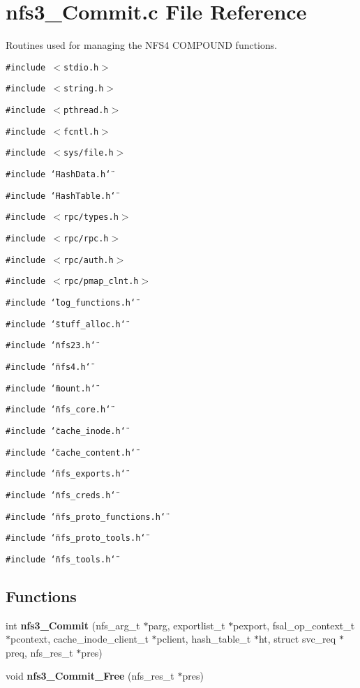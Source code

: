 \section{nfs3\_\-Commit.c File Reference}
\label{nfs3__Commit_8c}
Routines used for managing the NFS4 COMPOUND functions. 

{\tt \#include $<$stdio.h$>$}\par
{\tt \#include $<$string.h$>$}\par
{\tt \#include $<$pthread.h$>$}\par
{\tt \#include $<$fcntl.h$>$}\par
{\tt \#include $<$sys/file.h$>$}\par
{\tt \#include \char`\"{}Hash\-Data.h\char`\"{}}\par
{\tt \#include \char`\"{}Hash\-Table.h\char`\"{}}\par
{\tt \#include $<$rpc/types.h$>$}\par
{\tt \#include $<$rpc/rpc.h$>$}\par
{\tt \#include $<$rpc/auth.h$>$}\par
{\tt \#include $<$rpc/pmap\_\-clnt.h$>$}\par
{\tt \#include \char`\"{}log\_\-functions.h\char`\"{}}\par
{\tt \#include \char`\"{}stuff\_\-alloc.h\char`\"{}}\par
{\tt \#include \char`\"{}nfs23.h\char`\"{}}\par
{\tt \#include \char`\"{}nfs4.h\char`\"{}}\par
{\tt \#include \char`\"{}mount.h\char`\"{}}\par
{\tt \#include \char`\"{}nfs\_\-core.h\char`\"{}}\par
{\tt \#include \char`\"{}cache\_\-inode.h\char`\"{}}\par
{\tt \#include \char`\"{}cache\_\-content.h\char`\"{}}\par
{\tt \#include \char`\"{}nfs\_\-exports.h\char`\"{}}\par
{\tt \#include \char`\"{}nfs\_\-creds.h\char`\"{}}\par
{\tt \#include \char`\"{}nfs\_\-proto\_\-functions.h\char`\"{}}\par
{\tt \#include \char`\"{}nfs\_\-proto\_\-tools.h\char`\"{}}\par
{\tt \#include \char`\"{}nfs\_\-tools.h\char`\"{}}\par
\subsection*{Functions}
\begin{CompactItemize}
\item 
int {\bf nfs3\_\-Commit} (nfs\_\-arg\_\-t $\ast$parg, exportlist\_\-t $\ast$pexport, fsal\_\-op\_\-context\_\-t $\ast$pcontext, cache\_\-inode\_\-client\_\-t $\ast$pclient, hash\_\-table\_\-t $\ast$ht, struct svc\_\-req $\ast$preq, nfs\_\-res\_\-t $\ast$pres)
\item 
void {\bf nfs3\_\-Commit\_\-Free} (nfs\_\-res\_\-t $\ast$pres)
\end{CompactItemize}
